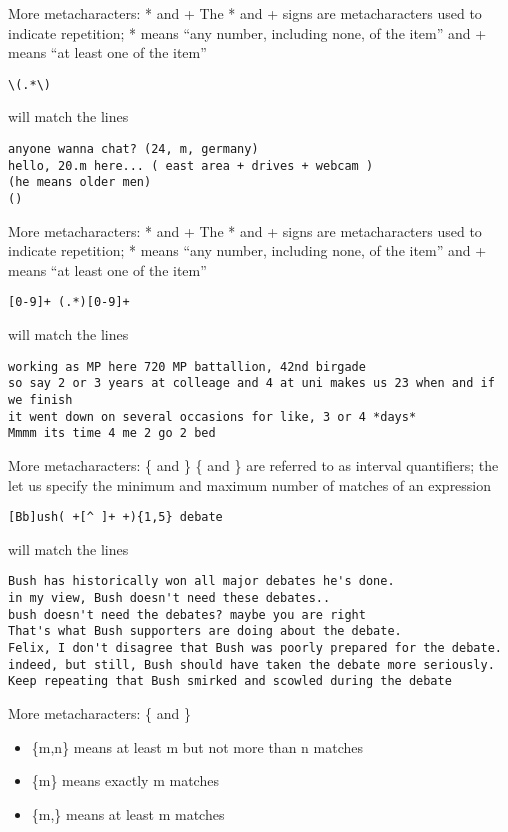 \documentclass[aspectratio=169]{beamer}
\begin{document}
\begin{frame}[fragile]{More metacharacters: * and +}
The * and + signs are metacharacters used to indicate repetition; * 
means ``any number, including none, of the item'' and + means ``at 
least one of the item''
\begin{verbatim}
\(.*\)
\end{verbatim}
will match the lines 
\begin{verbatim}
anyone wanna chat? (24, m, germany)
hello, 20.m here... ( east area + drives + webcam ) 
(he means older men) 
()
\end{verbatim}
\end{frame}

\begin{frame}[fragile]{More metacharacters: * and +}
The * and + signs are metacharacters used to indicate repetition; * 
means ``any number, including none, of the item'' and + means ``at 
least one of the item''
\begin{verbatim}
[0-9]+ (.*)[0-9]+
\end{verbatim}
will match the lines 
\begin{verbatim}
working as MP here 720 MP battallion, 42nd birgade 
so say 2 or 3 years at colleage and 4 at uni makes us 23 when and if we finish
it went down on several occasions for like, 3 or 4 *days*
Mmmm its time 4 me 2 go 2 bed
\end{verbatim}
\end{frame}

\begin{frame}[fragile]{More metacharacters: \{ and \}}
\{ and \} are referred to as interval quantifiers; the let us specify
the minimum and maximum number of matches of an expression
\begin{verbatim}
[Bb]ush( +[^ ]+ +){1,5} debate
\end{verbatim}
will match the lines 
\begin{verbatim}
Bush has historically won all major debates he's done. 
in my view, Bush doesn't need these debates..
bush doesn't need the debates? maybe you are right 
That's what Bush supporters are doing about the debate. 
Felix, I don't disagree that Bush was poorly prepared for the debate.
indeed, but still, Bush should have taken the debate more seriously.
Keep repeating that Bush smirked and scowled during the debate 
\end{verbatim}
\end{frame}

\begin{frame}[fragile]{More metacharacters: \{ and \}}
\begin{itemize}
\item
\{m,n\} means at least m but not more than n matches
\item
\{m\} means exactly m matches
\item
\{m,\} means at least m matches
\end{itemize}
\end{frame}
\end{document}
